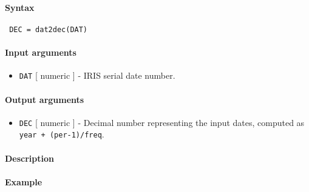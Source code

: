 


	\paragraph{Syntax}
 
 \begin{verbatim}
 DEC = dat2dec(DAT)
 \end{verbatim}
 
 \paragraph{Input arguments}
 
 \begin{itemize}
 \item
   \texttt{DAT} {[} numeric {]} - IRIS serial date number.
 \end{itemize}
 
 \paragraph{Output arguments}
 
 \begin{itemize}
 \item
   \texttt{DEC} {[} numeric {]} - Decimal number representing the input
   dates, computed as \texttt{year + (per-1)/freq}.
 \end{itemize}
 
 \paragraph{Description}
 
 \paragraph{Example}


